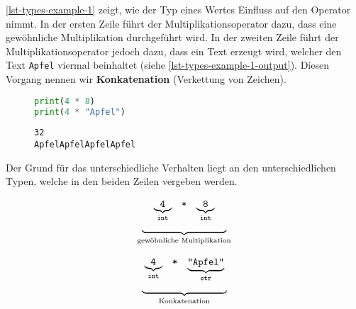 \begin{example}

\autoref{lst-types-example-1} zeigt, wie der Typ eines Wertes Einfluss auf den Operator nimmt. In der ersten Zeile führt der Multiplikationsoperator dazu, dass eine gewöhnliche Multiplikation durchgeführt wird. In der zweiten Zeile führt der Multiplikationsoperator jedoch dazu, dass ein Text erzeugt wird, welcher den Text \lstinline{Apfel} viermal beinhaltet (siehe \autoref{lst-types-example-1-output}). Diesen Vorgang nennen wir \textbf{Konkatenation} (Verkettung von Zeichen).

\begin{figure}[htb]
\begin{minipage}{0.45\textwidth}
\begin{lstlisting}[language=python, label={lst-types-example-1}, caption={Beide Zeilen verwenden den Multiplikationsoperator.}]
print(4 * 8)
print(4 * "Apfel")
\end{lstlisting}
\end{minipage}
\hfill
\begin{minipage}{0.45\textwidth}
\begin{lstlisting}[language=output, label={lst-types-example-1-output}, caption={Gewöhnliche Multiplikation und Konkatenation des Texts.}]
32
ApfelApfelApfelApfel
\end{lstlisting}
\end{minipage}
\end{figure}

Der Grund für das unterschiedliche Verhalten liegt an den unterschiedlichen Typen, welche in den beiden Zeilen vergeben werden.

\begin{minipage}{0.45\textwidth}
$$
\begin{array}[t]{c}
\begin{array}[t]{ccc}
\underbrace{\texttt{4}}_{\texttt{int}} & \texttt{*} & \underbrace{\texttt{8}}_{\texttt{int}}
\end{array} \\
\underbrace{\hspace{3cm}}_{\textrm{gewöhnliche Multiplikation}}
\end{array}
$$
\end{minipage}
\begin{minipage}{0.45\textwidth}
$$
\begin{array}[t]{c}
\begin{array}[t]{ccc}
\underbrace{\texttt{4}}_{\texttt{int}} & \texttt{*} & \underbrace{\texttt{``Apfel``}}_{\texttt{str}}
\end{array} \\
\underbrace{\hspace{3cm}}_{\textrm{Konkatenation}}
\end{array}
$$
\end{minipage}

\end{example}

